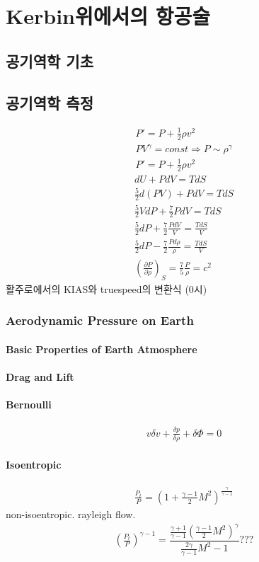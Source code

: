 \part{Kerbin위에서의 항공술}
\chapter{공기역학 기초}
\chapter{공기역학 측정}
\begin{align}
P'= P + \frac{1}{2} \rho v^2
\\
PV^\gamma=const \Rightarrow P \sim \rho^\gamma
\\
P'= P + \frac{1}{2} \rho v^2
\end{align}
\begin{align}
	dU +PdV = TdS
	\\ \frac{5}{2}d(PV) + PdV = TdS
	\\ \frac{5}{2} VdP + \frac{7}{2} PdV = TdS 
	\\ \frac{5}{2} dP + \frac{7}{2} \frac{PdV}{V} =\frac{TdS}{V} 
	\\ \frac{5}{2} dP -\frac{7}{2} \frac{Pd\rho}{\rho} =\frac{TdS}{V} 
	\\ \left(\frac{\partial P}{\partial\rho}\right)_S = \frac{7}{5}\frac{P}{\rho} = c^2
\end{align}
활주로에서의 KIAS와 truespeed의 변환식 (0시)

\section{Aerodynamic Pressure on Earth}
\subsection{Basic Properties of Earth Atmosphere}
\subsection{Drag and Lift}
\subsection{Bernoulli}
	\begin{align}
		v\delta v + \frac{\delta p}{\delta \rho} + \delta \Phi = 0
	\end{align}
\subsection{Isoentropic}
	\begin{align}
		\frac{P_t}{P} = \left( 1+\frac{\gamma-1}{2}M^2 \right)^{\frac{\gamma}{\gamma -1}}
	\end{align}
	non-isoentropic. rayleigh flow.
	\begin{align}
		\left(\frac{P_t}{P}\right)^{\gamma-1} = \dfrac{\tfrac{\gamma+1}{\gamma-1}\left(\tfrac{\gamma-1}{2} M^2\right)^\gamma}{\tfrac{2\gamma}{\gamma-1} M^2-1}???
	\end{align}
